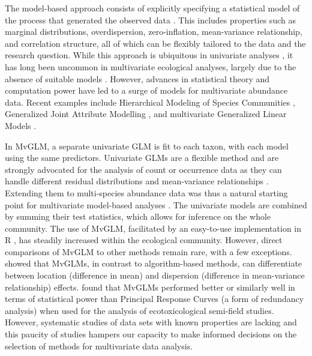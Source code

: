 \documentclass[a4paper,11pt]{article}
\begin{document}
	The model-based approach consists of explicitly specifying a statistical model of the process that generated the observed data \citep{Warton2015a}.
	This includes properties such as marginal distributions, overdispersion, zero-inflation, mean-variance relationship, and correlation structure, all of which can be flexibly tailored to the data and the research question.
	While this approach is ubiquitous in univariate analyses \citep[e.g.][]{bolker2008ecological, zuur2010protocol}, it has long been uncommon in multivariate ecological analyses, largely due to the absence of suitable models \citep{anderson2001new}.
    However, advances in statistical theory and computation power have led to a surge of models for multivariate abundance data. 
	Recent examples include Hierarchical Modeling of Species Communities \citep{Ovaskainen2017}, Generalized Joint 
	Attribute Modelling \citep{Clark2017},  and multivariate Generalized Linear Models \citep[MvGLM,][]{Warton2012}.
	
	
	In MvGLM, a separate univariate GLM is fit to each taxon, with each model using the same predictors. 
	Univariate GLMs are a flexible method and are strongly advocated for the analysis of count or occurrence data as they can handle different residual distributions and mean-variance relationships \citep{OHara2010, Warton2011, Szocs2015_b}.
	Extending them to multi-species abundance data was thus a natural starting point for multivariate model-based analyses \citep{Warton2012}.
	The univariate models are combined by summing their test statistics, which allows for inference on the whole community.
	The use of MvGLM, facilitated by an easy-to-use implementation in R  \citep[in the \textit{mvabund} R-package, ][]{Wang2019}, has steadily increased within the ecological community. 
	However, direct comparisons of MvGLM to other methods remain rare, with a few exceptions.
 	\citet{Warton2012} showed that MvGLMs, in contrast to algorithm-based methods, can differentiate between location (difference in mean) and dispersion (difference in mean-variance relationship) effects. 
	\citet{Szocs2015} found that MvGLMs performed better or similarly well in terms of statistical power than Principal Response Curves (a form of redundancy analysis) when used for the analysis of ecotoxicological semi-field studies. 
	However, systematic studies of data sets with known properties are lacking and this paucity of studies hampers our capacity to make informed decisions on the selection of methods for multivariate data analysis.\\
\end{document}
